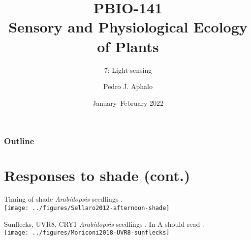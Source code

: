 \documentclass[10pt]{beamer}\usepackage[]{graphicx}\usepackage[]{color}
\begin{document}
\title{PBIO-141\\Sensory and Physiological Ecology\\of  Plants}
\subtitle{7: Light sensing}
\author{Pedro J. Aphalo}
\date{January--February 2022}


  \begin{frame}
    \maketitle
  \end{frame}



  \begin{frame}
    \frametitle{Outline}
    \tableofcontents
  \end{frame}

\section{Responses to shade (cont.)}

\begin{frame}{Timing of shade}{}
    {\footnotesize  \textit{Arabidopsis} seedlings \autocite[from][]{Sellaro2012}.\\}
    \texttt{[image: ../figures/Sellaro2012-afternoon-shade]}
\end{frame}

\begin{frame}{Sunflecks, UVR8, CRY1}{}
    {\footnotesize \textit{Arabidopsis} seedlings \autocite[from][]{Moriconi2018}. In A \mmol should read \umol.\\}
    \texttt{[image: ../figures/Moriconi2018-UVR8-sunflecks]}
\end{frame}
\end{document}
